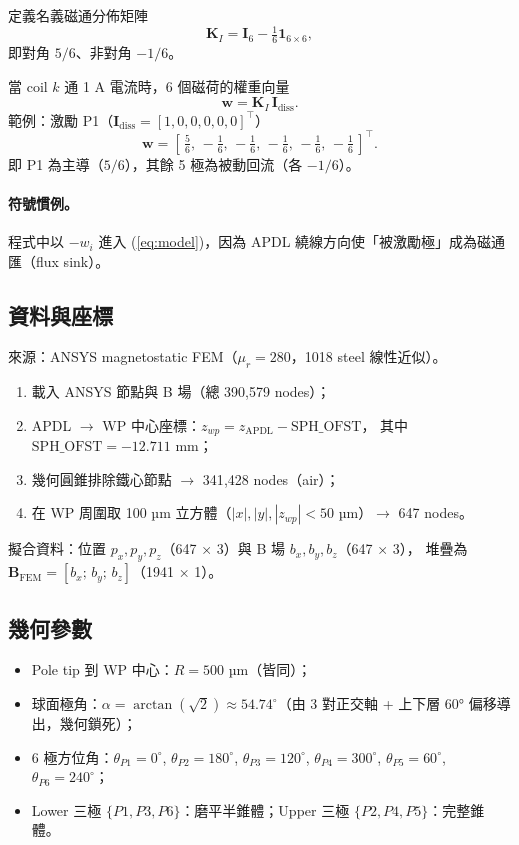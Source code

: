 \documentclass[11pt,a4paper]{article}
\newcommand{\KI}{\mathbf{K}_I}
\newcommand{\Idiss}{\mathbf{I}_{\mathrm{diss}}}
\newcommand{\bvec}{\mathbf{B}}
\begin{document}
定義名義磁通分佈矩陣
\begin{equation}
\KI = \mathbf{I}_6 - \tfrac{1}{6} \mathbf{1}_{6\times 6},
\end{equation}
即對角 \(5/6\)、非對角 \(-1/6\)。

當 coil \(k\) 通 1 A 電流時，6 個磁荷的權重向量
\begin{equation}
\mathbf{w} = \KI \, \Idiss .
\end{equation}
範例：激勵 P1（\(\Idiss = [1,0,0,0,0,0]^\top\)）
\begin{equation}
\mathbf{w} = \left[\,\tfrac{5}{6},\, -\tfrac{1}{6},\, -\tfrac{1}{6},\,
-\tfrac{1}{6},\, -\tfrac{1}{6},\, -\tfrac{1}{6}\,\right]^\top .
\end{equation}
即 P1 為主導（\(5/6\)），其餘 5 極為被動回流（各 \(-1/6\)）。

\paragraph{符號慣例。}
程式中以 \(-w_i\) 進入 (\ref{eq:model})，因為 APDL 繞線方向使「被激勵極」成為磁通匯（flux sink）。

\subsection{資料與座標}

來源：ANSYS magnetostatic FEM（\(\mu_r = 280\)，1018 steel 線性近似）。
\begin{enumerate}[leftmargin=*]
\item 載入 ANSYS 節點與 B 場（總 390{,}579 nodes）；
\item APDL \(\rightarrow\) WP 中心座標：\(z_{wp} = z_{\text{APDL}} - \mathrm{SPH\_OFST}\)，
其中 \(\mathrm{SPH\_OFST} = -12.711\) mm；
\item 幾何圓錐排除鐵心節點 \(\rightarrow\) 341{,}428 nodes（air）；
\item 在 WP 周圍取 100 µm 立方體（\(|x|,|y|,|z_{wp}| < 50\) µm）\(\rightarrow\) 647 nodes。
\end{enumerate}
擬合資料：位置 \(p_x, p_y, p_z\)（647 × 3）與 B 場 \(b_x, b_y, b_z\)（647 × 3），
堆疊為 \(\bvec_{\text{FEM}} = [b_x;\, b_y;\, b_z]\)（1941 × 1）。

\subsection{幾何參數}

\begin{itemize}[leftmargin=*]
\item Pole tip 到 WP 中心：\(R = 500\) µm（皆同）；
\item 球面極角：\(\alpha = \arctan(\sqrt{2}) \approx 54.74^\circ\)（由 3 對正交軸 + 上下層 60° 偏移導出，幾何鎖死）；
\item 6 極方位角：\(\theta_{P1}=0^\circ\), \(\theta_{P2}=180^\circ\), \(\theta_{P3}=120^\circ\),
\(\theta_{P4}=300^\circ\), \(\theta_{P5}=60^\circ\), \(\theta_{P6}=240^\circ\)；
\item Lower 三極 \(\{P1, P3, P6\}\)：磨平半錐體；Upper 三極 \(\{P2, P4, P5\}\)：完整錐體。
\end{itemize}
\end{document}

